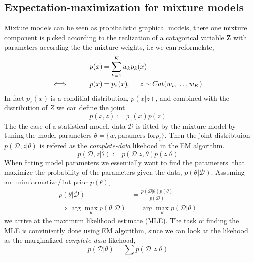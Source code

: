 \subsection{Expectation-maximization for mixture models}
Mixture models can be seen as probibalistic graphical models, there one mixture component is
picked according to the realization of a catagorical variable $\textbf{Z}$ with parameters according
the the mixture weights, i.e we can reformelate, 
\begin{align}\label{mixture_pdf}
    p(x) &= \sum_{k=1}^K w_k p_k(x)\\
   \iff \hspace*{1cm} p(x) &= p_z(x), \hspace*{0.5cm} z \sim Cat(w_i, \dots, w_K).
\end{align}
In fact $p_z(x)$ is a conditial distribution, $p(x|z)$, and combined with the distribution
of $Z$ we can define the joint 
$$p(x,z):=p_z(x)p(z)$$
The the case of a statistical model, data $\mathcal{D}$ is fitted by the mixture model 
by tuning the model parameters $\theta = \{w, \text{paramers for} p_i\}$. Then the joint
distribtuion $p(\mathcal{D},z| \theta)$ is refered as the \textit{complete-data} likehood in the EM algorithm. 
$$p(\mathcal{D},z|\theta):=p(\mathcal{D}|z,\theta)p(z|\theta)$$ 
When fitting model parameters we essentially want to find the parameters, that maximize the probability of
the parameters given the data, $p(\theta|\mathcal{D})$. Assuming an
unimformative/flat prior $p(\theta)$, 
\begin{align*}
p(\theta|\mathcal{D})&= \frac{p(\mathcal{D}|\theta)p(\theta)}{p(\mathcal{D})}\\
\Rightarrow  \arg\max_{\theta} p(\theta|\mathcal{D}) &= \arg\max_{\theta} p(\mathcal{D}|\theta)
\end{align*}
we arrive at the maximum likelihood estimate (MLE). The task of finding the MLE is conviniently
done using EM algorithm, since we can look at the likehood as the marginalized
\textit{complete-data} likehood, 
$$p(\mathcal{D}|\theta) = \sum_z p(\mathcal{D}, z|\theta)$$


